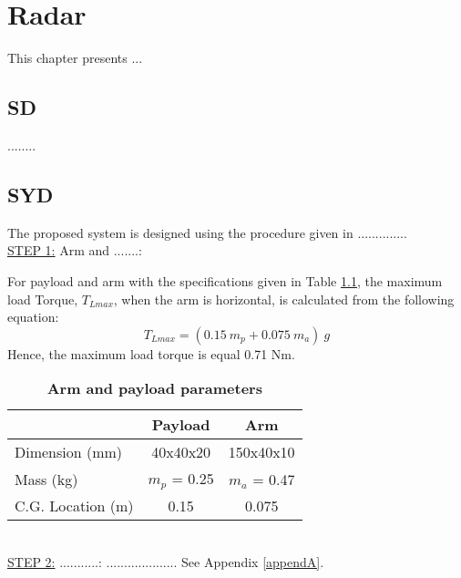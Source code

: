 \chapter{Radar}
\label{chapter:Radar}


\ifpdf
\graphicspath{{3_Radar/figures/PNG/}{3_Radar/figures/PDF/}{3_Radar/figures/}}
\else
\graphicspath{{3_Radar/figures/EPS/}{3_Radar/figures/}}
\fi

This chapter presents ...

\section{SD}

........

\section{SYD}
\noindent The proposed system is designed using the procedure given in ..............\\

\underline{STEP 1:} Arm and .......:

For payload and arm with the specifications given in Table \ref{Tabel_Armandpaylaod}, the maximum load Torque, $T_{Lmax}$, when the arm is horizontal, is calculated from the following equation:
\begin{equation}
	\label{eqloadtorque}
	T_{Lmax} = (0.15\ m_p + 0.075\ m_a)\ g
\end{equation}
Hence, the maximum load torque is equal 0.71 Nm.
\begin{table}[t]
	\caption{\textbf{Arm and payload parameters}}
	\centering
	\label{Tabel_Armandpaylaod}
	\begin{tabular}{|l|c|c|}
		\hline
		& \textbf{Payload} & \textbf{Arm} \\  \hline
		Dimension (mm) & 40x40x20  & 150x40x10 \\  \hline
		Mass (kg) & $m_p$ = 0.25  & $m_a$ = 0.47   \\   \hline
		C.G. Location (m) & 0.15 & 0.075	\\    \hline
	\end{tabular}
\end{table}
\\ 
\underline{STEP 2:} ...........:
.................... See Appendix \ref{appendA}.


